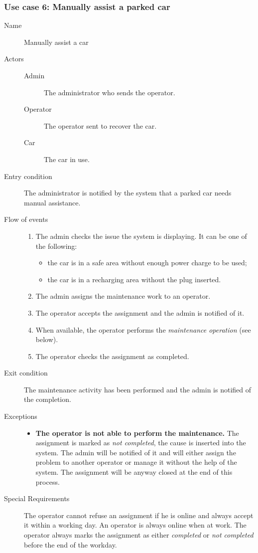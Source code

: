 	\subsubsection{Use case 6: Manually assist a parked car}
		\begin{description}
			\item[Name] Manually assist a car
			\item[Actors] \hfill
				\begin{description}
					\item[Admin] The administrator who sends the operator.
					\item[Operator] The operator sent to recover the car.
					\item[Car] The car in use.
				\end{description}
			\item[Entry condition] The administrator is notified by the system that a parked car needs manual assistance.
			\item[Flow of events] \hfill
				\begin{enumerate}
					\item The admin checks the issue the system is displaying. It can be one of the following:
						\begin{itemize}
							\item the car is in a safe area without enough power charge to be used;
							\item the car is in a recharging area without the plug inserted.
						\end{itemize}
					\item The admin assigns the maintenance work to an operator.
					\item The operator accepts the assignment and the admin is notified of it.
					\item When available, the operator performs the \textit{maintenance operation} (see below).
					\item The operator checks the assignment as completed.
				\end{enumerate}
			\item[Exit condition] The maintenance activity has been performed and the admin is notified of the completion.
			\item[Exceptions] \hfill
				\begin{itemize}
					\item \textbf{The operator is not able to perform the maintenance.} The assignment is marked as \textit{not completed}, the cause is inserted into the system. The admin will be notified of it and will either assign the problem to another operator or manage it without the help of the system. The assignment will be anyway closed at the end of this process.
				\end{itemize}
			\item[Special Requirements] The operator cannot refuse an assignment if he is online and always accept it within a working day. An operator is always online when at work.
			The operator always marks the assignment as either \textit{completed} or \textit{not completed} before the end of the workday.
		\end{description}
